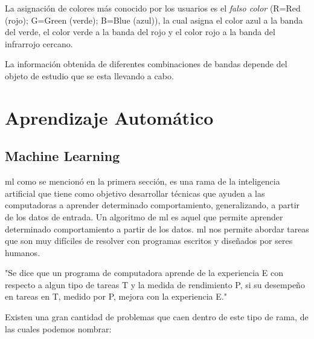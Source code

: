 La asignación de colores más conocido por los usuarios es el \textit{falso color} (R=Red (rojo); G=Green (verde); B=Blue (azul)), la cual asigna el color azul a la banda del verde, el color verde a la banda del rojo y el color rojo a la banda del infrarrojo cercano. 

La información obtenida de diferentes combinaciones de bandas depende del objeto de estudio que se esta llevando a cabo.


\section{Aprendizaje Automático}

\subsection{Machine Learning}
\ac{ml} como se mencionó en la primera sección, es una rama de la inteligencia artificial que tiene como objetivo desarrollar técnicas que ayuden a las computadoras a aprender determinado comportamiento, generalizando, a partir de los datos de entrada. Un algoritmo de \ac{ml} es aquel que permite aprender determinado comportamiento a partir de los datos. \ac{ml} nos permite abordar tareas que son muy difíciles de resolver con programas escritos y diseñados por seres humanos.

"Se dice que un programa de computadora aprende de la experiencia E con respecto a algun tipo de tareas T y la medida de rendimiento P, si su desempeño en tareas en T, medido por P, mejora con la experiencia E." \citep{Tom michell}

Existen una gran cantidad de problemas que caen dentro de este tipo de rama, de las cuales podemos nombrar:

